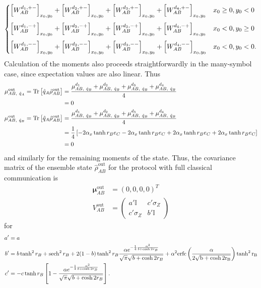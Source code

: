 \documentclass[%
 reprint,
 superscriptaddress,
 amsmath,
 amssymb,
 aps,
 pra,
]{revtex4-2}
\newcommand{\id}{\mathbb{I}}
\newcommand{\sz}{\sigma_Z}
\begin{document}
\begin{widetext}
\begin{align}
\begin{cases}
        \left[ W_{AB}^{d_1,+-} \right]_{x_0,y_0} + \left[ W_{AB}^{d_2,+-} \right]_{x_0,y_0} + \left[ W_{AB}^{d_3,+-} \right]_{x_0,y_0} + \left[ W_{AB}^{d_4,+-} \right]_{x_0,y_0}
        & x_0 \geq 0, y_0 < 0 \vspace{0.25cm} \\
        \left[ W_{AB}^{d_1,-+} \right]_{x_0,y_0} + \left[ W_{AB}^{d_2,-+} \right]_{x_0,y_0} + \left[ W_{AB}^{d_3,-+} \right]_{x_0,y_0} + \left[ W_{AB}^{d_4,-+} \right]_{x_0,y_0} & x_0 < 0, y_0 \geq 0 \vspace{0.25cm} \\
        \left[ W_{AB}^{d_1,--} \right]_{x_0,y_0} + \left[ W_{AB}^{d_2,--} \right]_{x_0,y_0} + \left[ W_{AB}^{d_3,--} \right]_{x_0,y_0} + \left[ W_{AB}^{d_4,--} \right]_{x_0,y_0} & x_0 < 0, y_0 < 0.
    \end{cases}
\end{align}
Calculation of the moments also proceeds straightforwardly in the many-symbol case, since expectation values are also linear. Thus
\begin{align}
    \mu_{AB, \ \hat q_A}^\mathrm{out} = \Tr \left[ \hat q_A \hat \rho_{AB}^\mathrm{out} \right] &= \frac{\mu_{AB, \ \hat q_B}^{d_1} + \mu_{AB, \ \hat q_B}^{d_2} + \mu_{AB, \ \hat q_B}^{d_3} + \mu_{AB, \ \hat q_B}^{d_4}}{4} \\
    &= 0 \\
    \mu_{AB, \ \hat q_B}^\mathrm{out} = \Tr \left[ \hat q_A \hat \rho_{AB}^\mathrm{out} \right] &= \frac{\mu_{AB, \ \hat q_B}^{d_1} + \mu_{AB, \ \hat q_B}^{d_2} + \mu_{AB, \ \hat q_B}^{d_3} + \mu_{AB, \ \hat q_B}^{d_4}}{4} \\
    &= \frac{1}{4} \left[ -2\alpha_x \tanh r_B e_C - 2\alpha_x \tanh r_B e_C + 2\alpha_x \tanh r_B e_C + 2 \alpha_x \tanh r_B e_C \right] \\
    &= 0
\end{align}
and similarly for the remaining moments of the state. Thus, the covariance matrix of the ensemble state $\hat \rho_{AB}^\mathrm{out}$ for the protocol with full classical communication is
\begin{align}
    \bm{\mu}_{AB}^\mathrm{out} &= (0,0,0,0)^T \\
    V_{AB}^\mathrm{out} &= \begin{pmatrix}
        a' \id & c' \sz \\
        c' \sz & b' \id
    \end{pmatrix}
\end{align}
for 
\begin{align}
    a' &= a \\
    b' &= b \tanh^2 r_B + \sech^2 r_B + 2(1-b) \tanh^2r_B \frac{\alpha e^{-\frac{1}{4}\frac{\alpha^2}{b + \cosh2r_B}}}{\sqrt{\pi}\sqrt{b + \cosh 2r_B}} + \alpha^2 \mathrm{erfc\left( \frac{\alpha}{2\sqrt{b + \cosh 2r_B}} \right) \tanh^2 r_B} \\
    c' &= -c \tanh r_B \left[ 1 - \frac{\alpha e^{-\frac{1}{4}\frac{\alpha^2}{b + \cosh2r_B}}}{\sqrt{\pi}\sqrt{b + \cosh2r_B}} \right].
\end{align}


\end{widetext}
\end{document}
